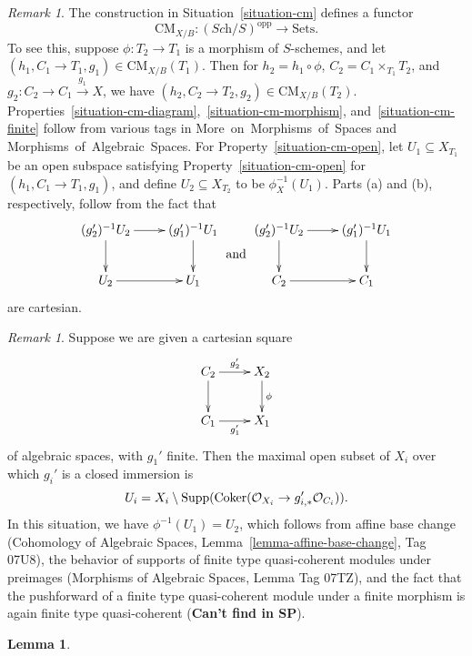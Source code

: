 \documentclass{stacks-project}
\theoremstyle{plain}
\newtheorem{lemma}[subsection]{Lemma}
\theoremstyle{definition}
\theoremstyle{remark}
\newtheorem{remark}[subsection]{Remark}
\numberwithin{equation}{subsection}
\def\Sch{\textit{Sch}}
\def\Coker{\mathop{\rm Coker}}
\def\CMfunctor{\mathcal{C}\!{\it oh}}
\def\CMfunctor{\text{CM}}
\begin{document}
\begin{remark}\label{cm-functor}
The construction in Situation~\ref{situation-cm} defines a functor
$$
    \CMfunctor_{X/B}\colon \left( \Sch/S \right)^{\text{opp}} \rightarrow \text{Sets}.
$$
To see this, suppose $\phi\colon T_2 \rightarrow T_1$ is a morphism of $S$-schemes, and let $(h_1,C_1 \rightarrow T_1,g_1) \in \CMfunctor_{X/B}(T_1)$. 
Then for $h_2 = h_1 \circ \phi$, $C_2 = C_1 \times_{T_1} T_2$, and $g_2\colon C_2 \rightarrow C_1 \xrightarrow{g_1} X$, we have $(h_2, C_2 \rightarrow T_2, g_2) \in \CMfunctor_{X/B}(T_2)$. 
Properties~\ref{situation-cm-diagram},~\ref{situation-cm-morphism}, and~\ref{situation-cm-finite} follow from various tags in More~on~Morphisms~of~Spaces and Morphisms~of~Algebraic~Spaces. %
For Property~\ref{situation-cm-open}, let $U_1 \subseteq X_{T_1}$ be an open subspace satisfying Property~\ref{situation-cm-open} for $(h_1, C_1 \rightarrow T_1, g_1)$, and define $U_2 \subseteq X_{T_2}$ to be $\phi_X^{-1}(U_1)$. 
Parts (a) and (b), respectively, follow from the fact that
$$
\vcenter{\xymatrix{
(g_2')^{-1}U_2 \ar[r] \ar[d] & (g_1')^{-1}U_1 \ar[d] \\
U_2 \ar[r] & U_1
}} \text{ and }
\vcenter{\xymatrix{
(g_2')^{-1}U_2 \ar[r] \ar[d] & (g_1')^{-1}U_1 \ar[d] \\
C_2 \ar[r] & C_1
}}
$$
are cartesian.
\end{remark}

\begin{remark}\label{cm-base-change}
Suppose we are given a cartesian square
$$
\xymatrix{
    C_2 \ar[r]^{g_2'} \ar[d] & X_2 \ar[d]^{\phi} \\
    C_1 \ar[r]_{g_1'} & X_1
}
$$
of algebraic spaces, with $g_1'$ finite. Then the maximal open subset of $X_i$ over which $g_i'$ is a closed immersion is
$$
    U_i = X_i \setminus \text{Supp}(\Coker(\mathcal{O}_{X_i} \rightarrow g_{i,*}'\mathcal{O}_{C_i})).
$$
    In this situation, we have $\phi^{-1}(U_1) = U_2$, which follows from affine base change (Cohomology of Algebraic Spaces, Lemma~\ref{lemma-affine-base-change}, Tag 07U8), the behavior of supports of finite type quasi-coherent modules under preimages (Morphisms of Algebraic Spaces, Lemma Tag 07TZ), and the fact that the pushforward of a finite type quasi-coherent module under a finite morphism is again finite type quasi-coherent ({\bfseries Can't find in SP}).
\end{remark}

\begin{lemma}\label{cm-dense-fibers}
\end{lemma}
\end{document}
